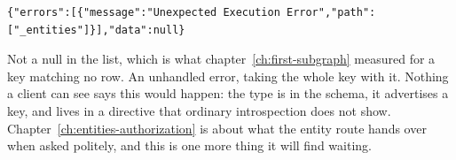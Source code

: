 \begin{verbatim}
{"errors":[{"message":"Unexpected Execution Error","path":["_entities"]}],"data":null}
\end{verbatim}

%
Not a null in the list, which is what chapter~\ref{ch:first-subgraph} measured
for a key matching no row. An unhandled error, taking the whole 
key with it. Nothing a client can see says this would happen: the type is in
the schema, it advertises a key, and  lives in a
directive that ordinary introspection does not show. Chapter~\ref{ch:entities-authorization}
is about what the entity route hands over when asked politely, and this is one
more thing it will find waiting.
%
